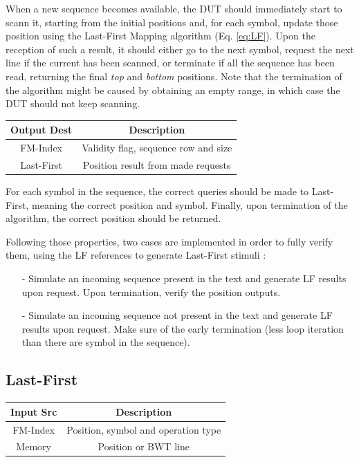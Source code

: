 When a new sequence becomes available, the DUT should immediately start to scann it, starting from the initial positions and, for each symbol, update those position using the Last-First Mapping algorithm (Eq. \ref{eq:LF}). Upon the reception of such a result, it should either go to the next symbol, request the next line if the current has been scanned, or terminate if all the sequence has been read, returning the final \textsl{top} and \textsl{bottom} positions. Note that the termination of the algorithm might be caused by obtaining an empty range, in which case the DUT should not keep scanning. \\
\begin{center}
\begin{tabular}{|c|c|}
\hline
  Output Dest   &  Description \\
  \hline
   FM-Index  & Validity flag, sequence row and size \\
   Last-First & Position result from made requests \\
   \hline
\end{tabular}
\end{center}
\vspace*{5mm}
For each symbol in the sequence, the correct queries should be made to Last-First, meaning the correct position and symbol. Finally, upon termination of the algorithm, the correct position should be returned.

Following those properties, two cases are implemented in order to fully verify them, using the LF references to generate Last-First stimuli :
\begin{itemize}
    \item [-] Simulate an incoming sequence present in the text and generate LF results upon request. Upon termination, verify the position outputs.
    \item [-]  Simulate an incoming sequence not present in the text and generate LF results upon request. Make sure of the early termination (less loop iteration than there are symbol in the sequence).
\end{itemize}

\subsection{Last-First}

\vspace*{3mm}
\begin{center}
    \begin{tabular}{|c|c|}
\hline
  Input Src   &  Description \\
  \hline
   FM-Index  & Position, symbol and operation type \\
   Memory & Position or BWT line \\
   \hline
\end{tabular}
\end{center}
\vspace*{5mm}

